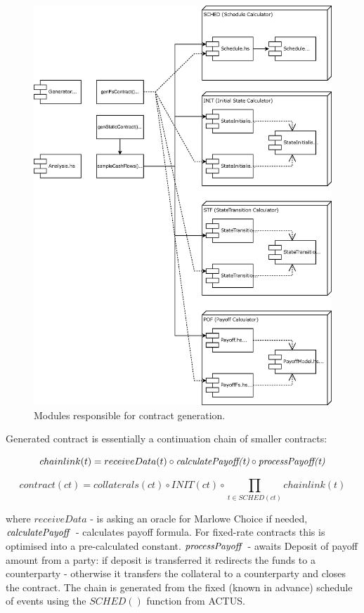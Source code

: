 \documentclass[runningheads]{llncs}
\begin{document}
\begin{figure}
\includegraphics[width=1\textwidth]{images/modules} \caption{Modules responsible for contract generation.}
\label{fig1} 
\end{figure}

Generated contract is essentially a continuation chain of smaller
contracts:

\noindent 
\begin{equation}
chainlink(t)=receiveData(t)\circ \mbox{\emph{calculatePayoff(t)}}\circ \mbox{\emph{processPayoff(t)}}
\end{equation}

\noindent 
\begin{equation}
contract(ct)=collaterals(ct)\circ INIT(ct)\circ\prod_{t\in SCHED(ct)}chainlink(t)
\end{equation}

where $receiveData$ - is asking an oracle for Marlowe Choice if needed,
$\mbox{\emph{calculatePayoff}}$ - calculates payoff formula. For fixed-rate contracts
this is optimised into a pre-calculated constant. $\mbox{\emph{processPayoff}}$
- awaits Deposit of payoff amount from a party: if deposit is transferred
it redirects the funds to a counterparty - otherwise it transfers
the collateral to a counterparty and closes the contract. The chain
is generated from the fixed (known in advance) schedule of events
using the $SCHED()$ function from ACTUS.
\end{document}
